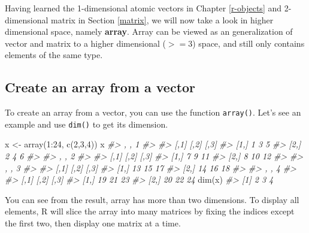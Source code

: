 \documentclass[
]{book}
\newenvironment{Shaded}{\begin{snugshade}}{\end{snugshade}}
\newcommand{\CommentTok}[1]{\textcolor[rgb]{0.56,0.35,0.01}{\textit{#1}}}
\newcommand{\DecValTok}[1]{\textcolor[rgb]{0.00,0.00,0.81}{#1}}
\newcommand{\FunctionTok}[1]{\textcolor[rgb]{0.00,0.00,0.00}{#1}}
\newcommand{\NormalTok}[1]{#1}
\newcommand{\OtherTok}[1]{\textcolor[rgb]{0.56,0.35,0.01}{#1}}
\newcommand{\SpecialCharTok}[1]{\textcolor[rgb]{0.00,0.00,0.00}{#1}}
\begin{document}
Having learned the 1-dimensional atomic vectors in Chapter \ref{r-objects} and 2-dimensional matrix in Section \ref{matrix}, we will now take a look in higher dimensional space, namely \textbf{array}. Array can be viewed as an generalization of vector and matrix to a higher dimensional (\(>=3\)) space, and still only contains elements of the same type.

\hypertarget{create-an-array-from-a-vector}{%
\subsection{Create an array from a vector}\label{create-an-array-from-a-vector}}

To create an array from a vector, you can use the function \texttt{array()}. Let's see an example and use \texttt{dim()} to get its dimension.

\begin{Shaded}
\begin{Highlighting}[]
\NormalTok{x }\OtherTok{\textless{}{-}} \FunctionTok{array}\NormalTok{(}\DecValTok{1}\SpecialCharTok{:}\DecValTok{24}\NormalTok{, }\FunctionTok{c}\NormalTok{(}\DecValTok{2}\NormalTok{,}\DecValTok{3}\NormalTok{,}\DecValTok{4}\NormalTok{))}
\NormalTok{x}
\CommentTok{\#\textgreater{} , , 1}
\CommentTok{\#\textgreater{} }
\CommentTok{\#\textgreater{}      [,1] [,2] [,3]}
\CommentTok{\#\textgreater{} [1,]    1    3    5}
\CommentTok{\#\textgreater{} [2,]    2    4    6}
\CommentTok{\#\textgreater{} }
\CommentTok{\#\textgreater{} , , 2}
\CommentTok{\#\textgreater{} }
\CommentTok{\#\textgreater{}      [,1] [,2] [,3]}
\CommentTok{\#\textgreater{} [1,]    7    9   11}
\CommentTok{\#\textgreater{} [2,]    8   10   12}
\CommentTok{\#\textgreater{} }
\CommentTok{\#\textgreater{} , , 3}
\CommentTok{\#\textgreater{} }
\CommentTok{\#\textgreater{}      [,1] [,2] [,3]}
\CommentTok{\#\textgreater{} [1,]   13   15   17}
\CommentTok{\#\textgreater{} [2,]   14   16   18}
\CommentTok{\#\textgreater{} }
\CommentTok{\#\textgreater{} , , 4}
\CommentTok{\#\textgreater{} }
\CommentTok{\#\textgreater{}      [,1] [,2] [,3]}
\CommentTok{\#\textgreater{} [1,]   19   21   23}
\CommentTok{\#\textgreater{} [2,]   20   22   24}
\FunctionTok{dim}\NormalTok{(x)}
\CommentTok{\#\textgreater{} [1] 2 3 4}
\end{Highlighting}
\end{Shaded}

You can see from the result, array has more than two dimensions. To display all elements, R will slice the array into many matrices by fixing the indices except the first two, then display one matrix at a time.
\end{document}
